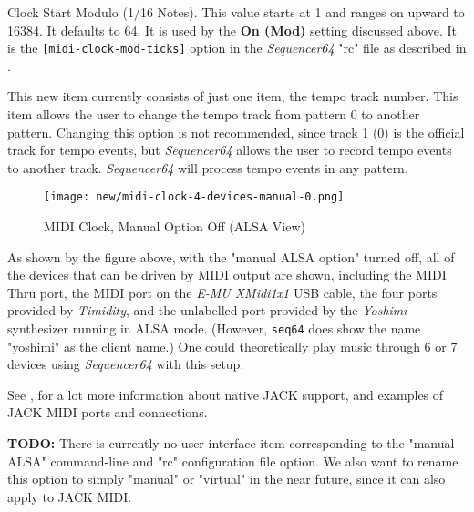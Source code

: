    Clock Start Modulo (1/16 Notes).
   This value starts at 1 and ranges on upward to 16384.
   It  defaults to 64.
   It is used by the \textbf{On (Mod)} setting discussed above.
   It is the \texttt{[midi-clock-mod-ticks]} option in the \textsl{Sequencer64}
   "rc" file as described in
   .

   This new item currently consists of just one item, the tempo track number.
   This item allows the user to change the tempo track from pattern 0 to
   another pattern.  Changing this option is not recommended, since track 1 (0)
   is the official track for tempo events, but \textsl{Sequencer64} allows the
   user to record tempo events to another track.  \textsl{Sequencer64} will
   process tempo events in any pattern.

\begin{figure}[H]
   \centering 
%
   \texttt{[image: new/midi-clock-4-devices-manual-0.png]}
   \caption{MIDI Clock, Manual Option Off (ALSA View)}
   \label{fig:seq64_midi_clock_4_devices_manual_0}
\end{figure}

   As shown by the figure above, with the "manual ALSA option" turned off,
   all of the devices that can be driven by MIDI output are shown,
   including the MIDI Thru port, the MIDI port on the
   \textsl{E-MU XMidi1x1} USB cable,
   the four ports provided by \textsl{Timidity}, and the unlabelled
   port provided by the \textsl{Yoshimi} synthesizer running in ALSA mode.
   (However, \texttt{seq64} does show the name "yoshimi" as the client name.)
   One could theoretically play music through 6 or 7 devices using
   \textsl{Sequencer64} with this setup.

   See ,
   for a lot more information about native JACK support, and examples of JACK
   MIDI ports and connections.

   \textbf{TODO:}
   There is currently no user-interface item corresponding to the "manual ALSA"
   command-line and "rc" configuration file option.
   We also want to rename this option to simply "manual" or "virtual"
   in the near future, since it can also apply to JACK MIDI.

